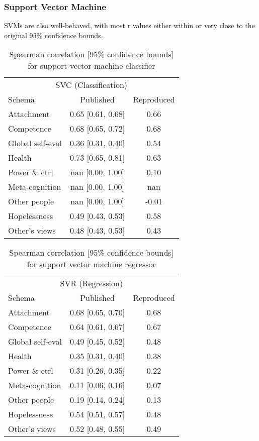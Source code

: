\documentclass[11pt,a4paper]{article}
\begin{document}
\subsubsection{Support Vector Machine}

SVMs are also well-behaved, with most r values either within or very close to the original 95\% confidence bounds.

\begin{table}[H]
\centering
\begin{tabular}{lcc}
\toprule
\multicolumn{3}{c}{\large SVC (Classification)} \\
Schema                  &Published          &Reproduced \\
\midrule
Attachment              & 0.65 [0.61, 0.68] & 0.66 \\
Competence              & 0.68 [0.65, 0.72] & 0.68 \\
Global self-eval        & 0.36 [0.31, 0.40] & 0.54 \\
Health                  & 0.73 [0.65, 0.81] & 0.63 \\
Power \& ctrl           & nan [0.00, 1.00]  & 0.10 \\
Meta-cognition          & nan [0.00, 1.00]  & nan  \\
Other people            & nan [0.00, 1.00]  & -0.01 \\
Hopelessness            & 0.49 [0.43, 0.53] & 0.58 \\
Other's views           & 0.48 [0.43, 0.53] & 0.43 \\
\bottomrule
\end{tabular}
\caption{Spearman correlation [95\% confidence bounds] for support vector machine classifier}
\label{tab:svm_classification}
\end{table}

\begin{table}[H]
\centering
\begin{tabular}{lcc}
\toprule
\multicolumn{3}{c}{\large SVR (Regression)} \\
Schema                  &Published          &Reproduced \\
\midrule
Attachment              & 0.68 [0.65, 0.70] & 0.68 \\
Competence              & 0.64 [0.61, 0.67] & 0.67 \\
Global self-eval        & 0.49 [0.45, 0.52] & 0.48 \\
Health                  & 0.35 [0.31, 0.40] & 0.38 \\
Power \& ctrl           & 0.31 [0.26, 0.35] & 0.22 \\
Meta-cognition          & 0.11 [0.06, 0.16] & 0.07 \\
Other people            & 0.19 [0.14, 0.24] & 0.13 \\
Hopelessness            & 0.54 [0.51, 0.57] & 0.48 \\
Other's views           & 0.52 [0.48, 0.55] & 0.49 \\
\bottomrule
\end{tabular}
\caption{Spearman correlation [95\% confidence bounds] for support vector machine regressor}
\label{tab:svm_Regression}
\end{table}
\end{document}
